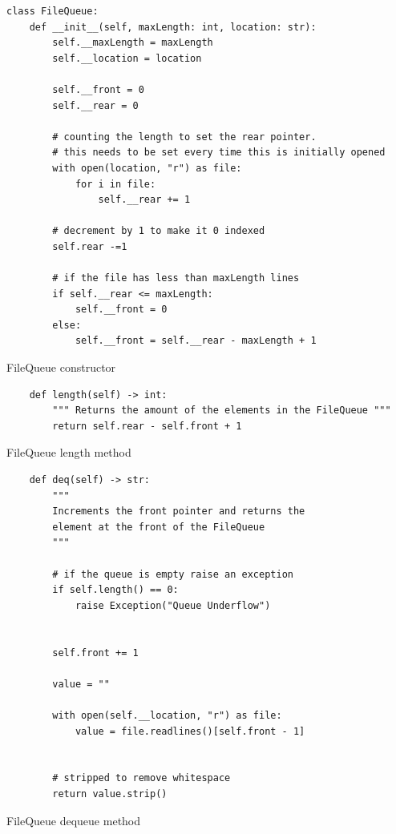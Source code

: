 \documentclass[11pt]{article}
\begin{document}
        \newpage
        \begin{listing}[!h]
            \begin{verbatim}
class FileQueue:
    def __init__(self, maxLength: int, location: str):
        self.__maxLength = maxLength
        self.__location = location
        
        self.__front = 0
        self.__rear = 0
        
        # counting the length to set the rear pointer. 
        # this needs to be set every time this is initially opened
        with open(location, "r") as file:
            for i in file:
                self.__rear += 1
                
        # decrement by 1 to make it 0 indexed
        self.rear -=1
                
        # if the file has less than maxLength lines
        if self.__rear <= maxLength:
            self.__front = 0
        else:
            self.__front = self.__rear - maxLength + 1
            \end{verbatim}
            \caption{FileQueue constructor}
            \label{sc:fileq-constructor}
        \end{listing}

        \newpage
        \begin{listing}[!h]
            \begin{verbatim}
    def length(self) -> int:
        """ Returns the amount of the elements in the FileQueue """
        return self.rear - self.front + 1
            \end{verbatim}
            \caption{FileQueue length method}
            \label{sc:fileq-length-method}
        \end{listing}

        \newpage
        \begin{listing}[!h]
            \begin{verbatim}
    def deq(self) -> str:
        """ 
        Increments the front pointer and returns the 
        element at the front of the FileQueue 
        """
        
        # if the queue is empty raise an exception
        if self.length() == 0:
            raise Exception("Queue Underflow")
        
        
        self.front += 1
        
        value = ""
        
        with open(self.__location, "r") as file:
            value = file.readlines()[self.front - 1]
            
        
        # stripped to remove whitespace
        return value.strip()
            \end{verbatim}
            \caption{FileQueue dequeue method}
            \label{sc:fileq-deq-method}
        \end{listing}
\end{document}
